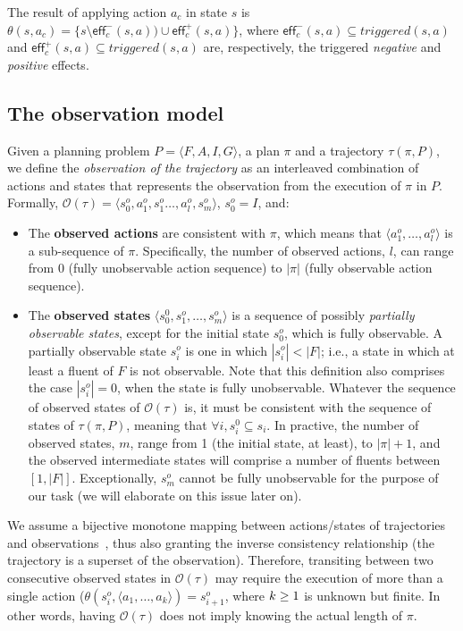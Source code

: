 \documentclass[letterpaper]{article} %
\newcommand{\tup}[1]{{\langle #1 \rangle}}
\newcommand{\eff}{\mathsf{eff}}     %
\begin{document}
The result of applying action $a_c$ in state $s$ is $\theta(s,a_c)=\{s\setminus\eff_c^-(s,a))\cup\eff_c^+(s,a)\}$, where $\eff_c^-(s,a)\subseteq triggered(s,a)$ and $\eff_c^+(s,a)\subseteq triggered(s,a)$ are, respectively, the triggered {\em negative} and {\em positive} effects.


\subsection{The observation model}
Given a planning problem $P=\tup{F,A,I,G}$, a plan $\pi$ and a trajectory $\tau(\pi,P)$, we define the \emph{observation of the trajectory} as an interleaved combination of actions and states that represents the observation from the execution of $\pi$ in $P$. Formally, $\mathcal{O}(\tau)=\tup{s_0^o,a_1^o,s_1^o \ldots , a_l^o, s_m^o}$, $s_0^o=I$, and:


\begin{itemize}
\item The {\bf observed actions} are consistent with $\pi$, which means that $\tup{a_1^o, \ldots, a_l^o}$ is a sub-sequence of $\pi$. Specifically, the number of observed actions, $l$, can range from $0$ (fully unobservable action sequence) to $|\pi|$ (fully observable action sequence).
\item The {\bf observed states} $\tup{s_0^0, s_1^o, \ldots, s_m^o}$ is a sequence of possibly {\em partially observable states}, except for the initial state $s_0^o$, which is fully observable. A partially observable state $s_i^o$ is one in which $|s_i^o| < |F|$; i.e., a state in which at least a fluent of $F$ is not observable. Note that this definition also comprises the case $|s_i^o| = 0$, when the state is fully unobservable. Whatever the sequence of observed states of $\mathcal{O}(\tau)$ is, it must be consistent with the sequence of states of $\tau(\pi,P)$, meaning that $\forall i, s_i^0 \subseteq s_i$. In practive, the number of observed states, $m$, range from 1 (the initial state, at least), to $|\pi|+1$, and the observed intermediate states will comprise a number of fluents between $[1,|F|]$. Exceptionally, $s_m^o$ cannot be fully unobservable for the purpose of our task (we will elaborate on this issue later on).
\end{itemize}

We assume a bijective monotone mapping between actions/states of trajectories and observations~\cite{ramirez2009plan}, thus also granting the inverse consistency relationship (the trajectory is a superset of the observation). Therefore, transiting between two consecutive observed states in $\mathcal{O}(\tau)$ may require the execution of more than a single action ($\theta(s_i^o,\tup{a_1,\ldots,a_k})=s_{i+1}^o$, where ${\small k\geq 1}$ is unknown but finite. In other words, having $\mathcal{O}(\tau)$ does not imply knowing the actual length of $\pi$.
\end{document}
